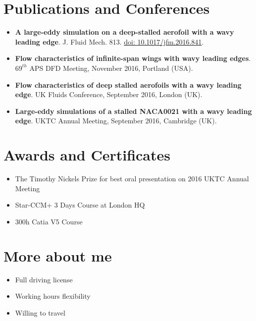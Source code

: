 \documentclass[fontsize=10pt]{tccv}
\begin{document}
\vspace{-25pt}
\section{Publications and Conferences} 
  	\begin{itemize}
	\itemsep -2pt
\item \textbf{A large-eddy simulation on a deep-stalled aerofoil with a wavy leading edge}. J. Fluid Mech. 813. \href{https://doi.org/10.1017/jfm.2016.841}{doi: 10.1017/jfm.2016.841}.
\item \textbf{Flow characteristics of infinite-span wings with wavy leading edges}. $69^{th}$ APS DFD Meeting, November 2016, Portland (USA). 
\item \textbf{Flow characteristics of deep stalled aerofoils with a wavy
leading edge}. UK Fluids Conference, September 2016, London (UK). 
\item \textbf{Large-eddy simulations of a stalled NACA0021 with a wavy
leading edge}. UKTC Annual Meeting, September 2016, Cambridge (UK).
	\end{itemize}

\vspace{-25pt}
\section{Awards and Certificates} 
  	\begin{itemize}
	\itemsep -2pt
	\item The Timothy Nickels Prize for best oral presentation on 2016 UKTC Annual Meeting
	\item Star-CCM+ 3 Days Course at London HQ
	\item 300h Catia V5 Course
	\end{itemize}

\vspace{-22pt}
\section{More about me} 
\begin{itemize}
	\itemsep -2pt
	\item Full driving license
	\item Working hours flexibility
	\item Willing to travel
\end{itemize}
\end{document}
